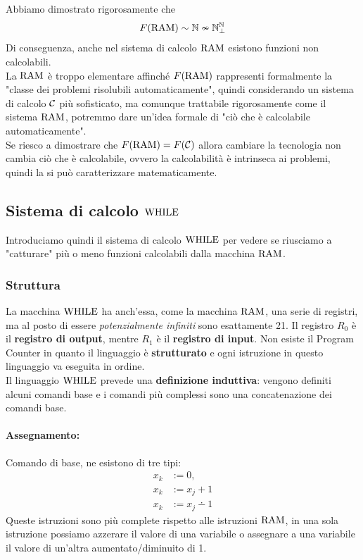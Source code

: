 Abbiamo dimostrato rigorosamente che 
$$ F(\text{RAM}) \sim \mathbb{N} \nsim \mathbb{N}^{\mathbb{N}}_\bot $$
Di conseguenza, anche nel sistema di calcolo $\text{RAM}$ esistono funzioni non calcolabili.\\

La $\text{RAM}$ è troppo elementare affinché $F(\text{RAM})$ rappresenti formalmente la "classe dei problemi risolubili automaticamente", quindi considerando un sistema di calcolo $\mathcal{C}$ più sofisticato, ma comunque trattabile rigorosamente come il sistema $\text{RAM}$, potremmo dare un'idea formale di "ciò che è calcolabile automaticamente".\\

Se riesco a dimostrare che $F(\text{RAM}) = F(\mathcal{C})$ allora cambiare la tecnologia non cambia ciò che è calcolabile, ovvero la calcolabilità è intrinseca ai problemi, quindi la si può caratterizzare matematicamente. \\

\subsection{Sistema di calcolo $\text{WHILE}$}
Introduciamo quindi il sistema di calcolo $\text{WHILE}$ per vedere se riusciamo a "catturare" più o meno funzioni calcolabili dalla macchina $\text{RAM}$.

\subsubsection{Struttura}
La macchina $\text{WHILE}$ ha anch'essa, come la macchina $\text{RAM}$, una serie di registri, ma al posto di essere \textit{potenzialmente infiniti} sono esattamente 21. Il registro $R_0$ è il \textbf{registro di output}, mentre $R_1$ è il \textbf{registro di input}. Non esiste il Program Counter in quanto il linguaggio è \textbf{strutturato} e ogni istruzione in questo linguaggio va eseguita in ordine.\\

Il linguaggio $\text{WHILE}$ prevede una \textbf{definizione induttiva}: vengono definiti alcuni comandi base e i comandi più complessi sono una concatenazione dei comandi base.\\

\paragraph{Assegnamento:} Comando di base, ne esistono di tre tipi: 
\begin{align*}
	x_k & := 0, \\
	x_k & := x_j + 1 \\
	x_k & := x_j \dotminus 1
\end{align*}
Queste istruzioni sono più complete rispetto alle istruzioni $\text{RAM}$, in una sola istruzione possiamo azzerare il valore di una variabile o assegnare a una variabile il valore di un'altra aumentato/diminuito di 1.

